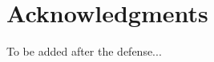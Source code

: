 \section*{Acknowledgments}

\begin{singlespace}

    To be added after the defense...

\end{singlespace}